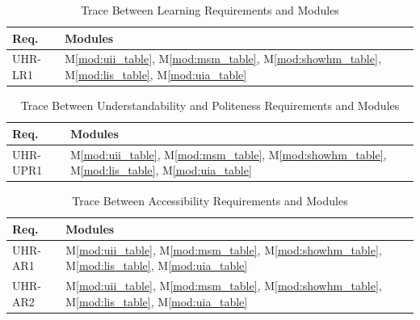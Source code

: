 \documentclass[12pt, titlepage]{article}
\newcommand{\mref}[1]{M\ref{#1}}
\begin{document}
\begin{table}[H]
  \caption{Trace Between Learning Requirements and Modules}
  \label{TblLRMT}
  \centering
  \small
  \begin{tabularx}{\textwidth}{>{\RaggedRight\arraybackslash}p{}Y}
    \toprule
    \textbf{Req.} & \textbf{Modules}\\
    \midrule
    UHR-LR1 & \mref{mod:uii_table}, \mref{mod:msm_table},
    \mref{mod:showhm_table}, \mref{mod:lis_table}, \mref{mod:uia_table}\\
    \bottomrule
  \end{tabularx}
\end{table}

\begin{table}[H]
  \caption{Trace Between Understandability and Politeness
  Requirements and Modules}
  \label{TblUPRT}
  \centering
  \small
  \begin{tabularx}{\textwidth}{>{\RaggedRight\arraybackslash}p{}Y}
    \toprule
    \textbf{Req.} & \textbf{Modules}\\
    \midrule
    UHR-UPR1 & \mref{mod:uii_table}, \mref{mod:msm_table},
    \mref{mod:showhm_table}, \mref{mod:lis_table}, \mref{mod:uia_table}\\
    \bottomrule
  \end{tabularx}
\end{table}

\begin{table}[H]
  \caption{Trace Between Accessibility Requirements and Modules}
  \label{TblART}
  \centering
  \small
  \begin{tabularx}{\textwidth}{>{\RaggedRight\arraybackslash}p{}Y}
    \toprule
    \textbf{Req.} & \textbf{Modules}\\
    \midrule
    UHR-AR1 & \mref{mod:uii_table}, \mref{mod:msm_table},
    \mref{mod:showhm_table}, \mref{mod:lis_table}, \mref{mod:uia_table}\\
    UHR-AR2 & \mref{mod:uii_table}, \mref{mod:msm_table},
    \mref{mod:showhm_table}, \mref{mod:lis_table}, \mref{mod:uia_table}\\
    \bottomrule
  \end{tabularx}
\end{table}
\end{document}
